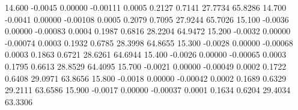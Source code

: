   14.600  -0.0045   0.00000  -0.00111   0.0005   0.2127   0.7141  27.7734  65.8286
  14.700  -0.0041   0.00000  -0.00108   0.0005   0.2079   0.7095  27.9244  65.7026
  15.100  -0.0036   0.00000  -0.00083   0.0004   0.1987   0.6816  28.2204  64.9472
  15.200  -0.0032   0.00000  -0.00074   0.0003   0.1932   0.6785  28.3998  64.8655
  15.300  -0.0028   0.00000  -0.00068   0.0003   0.1863   0.6721  28.6261  64.6944
  15.400  -0.0026   0.00000  -0.00065   0.0003   0.1795   0.6613  28.8529  64.4095
  15.700  -0.0021   0.00000  -0.00049   0.0002   0.1722   0.6408  29.0971  63.8656
  15.800  -0.0018   0.00000  -0.00042   0.0002   0.1689   0.6329  29.2111  63.6586
  15.900  -0.0017   0.00000  -0.00037   0.0001   0.1634   0.6204  29.4034  63.3306
